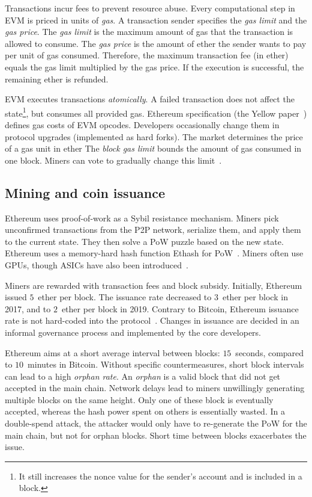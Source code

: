 Transactions incur fees to prevent resource abuse.
Every computational step in EVM is priced in units of \emph{gas}.
A transaction sender specifies the \textit{gas limit} and the \textit{gas price}.
The \textit{gas limit} is the maximum amount of gas that the transaction is allowed to consume.
The \textit{gas price} is the amount of ether the sender wants to pay per unit of gas consumed.
Therefore, the maximum transaction fee (in ether) equals the gas limit multiplied by the gas price.
If the execution is successful, the remaining ether is refunded.

EVM executes transactions \textit{atomically}.
A failed transaction does not affect the state\footnote{It still increases the nonce value for the sender's account and is included in a block.}, but consumes all provided gas.
Ethereum specification (the Yellow paper~\cite{Wood2014}) defines gas costs of EVM opcodes.
Developers occasionally change them in protocol upgrades (implemented as hard forks).
The market determines the price of a gas unit in ether
The \textit{block gas limit} bounds the amount of gas consumed in one block.
Miners can vote to gradually change this limit~\cite{Jnnk15}.


\subsection{Mining and coin issuance}

Ethereum uses proof-of-work as a Sybil resistance mechanism.
Miners pick unconfirmed transactions from the P2P network, serialize them, and apply them to the current state.
They then solve a PoW puzzle based on the new state.
Ethereum uses a memory-hard hash function Ethash for PoW~\cite{Ethash}.
Miners often use GPUs, though ASICs have also been introduced~\cite{OLeary2018}.

Miners are rewarded with transaction fees and block subsidy.
Initially, Ethereum issued $5$~ether per block.
The issuance rate decreased to $3$~ether per block in 2017, and to $2$~ether per block in 2019.
Contrary to Bitcoin, Ethereum issuance rate is not hard-coded into the protocol~\cite{Ethhub2020}.
Changes in issuance are decided in an informal governance process and implemented by the core developers.

Ethereum aims at a short average interval between blocks: $15$~seconds, compared to $10$~minutes in Bitcoin.
Without specific countermeasures, short block intervals can lead to a high \textit{orphan rate}.
An \textit{orphan} is a valid block that did not get accepted in the main chain.
Network delays lead to miners unwillingly generating multiple blocks on the same height.
Only one of these block is eventually accepted, whereas the hash power spent on others is essentially wasted.
In a double-spend attack, the attacker would only have to re-generate the PoW for the main chain, but not for orphan blocks.
Short time between blocks exacerbates the issue.

